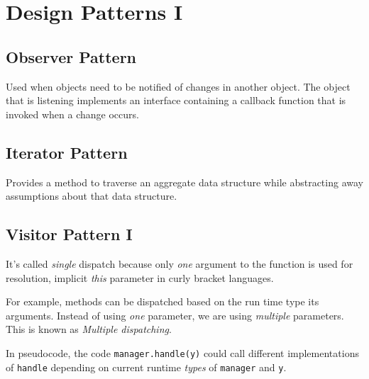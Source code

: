 
\chapter{Design Patterns I}


\section{Observer Pattern}

Used when objects need to be notified of changes in
another object. The object that is listening implements an
interface containing a callback function that is invoked when
a change occurs.

\section{Iterator Pattern}

Provides a method to traverse an aggregate data
structure while abstracting away assumptions about that
data structure.



\section{Visitor Pattern I}









It's called \textit{single} dispatch because only \textit{one} argument to the function is used
for resolution, implicit \textit{this} parameter in curly bracket languages.



For example, methods can be dispatched based on the run time type its arguments. 
Instead of using  \textit{one} parameter, we are using \textit{multiple} parameters.
This is known as \textit{Multiple dispatching}.


In pseudocode, the code \lstinline{manager.handle(y)} could call different 
implementations of \lstinline{handle} depending on current runtime 
\textit{types} of \lstinline{manager} and \lstinline{y}. 

